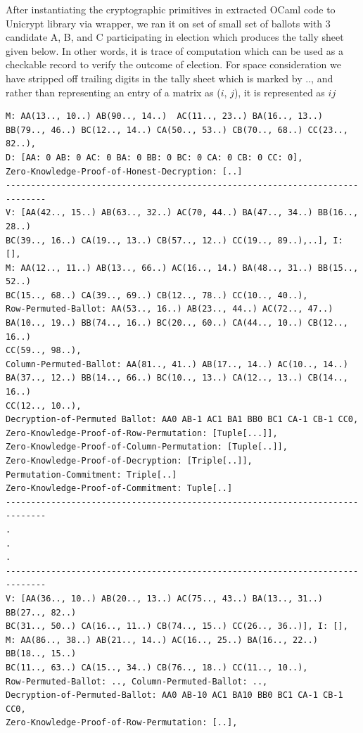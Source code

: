 \documentclass{llncs}
\begin{document}
 After instantiating the  
 cryptographic primitives in extracted OCaml code 
 to Unicrypt library via wrapper, we ran it on set of
 small set of ballots with 3 candidate A, B, and C participating in election
 which produces the tally sheet given below. In other words, 
 it is trace of computation which can be used as a checkable record to verify
 the outcome of election. For space consideration we have stripped off 
 trailing digits in the tally sheet which is marked by $..$, and rather 
 than representing an entry of a matrix as ($i$, $j$), it is represented as 
 $ij$
 

\begin{lstlisting}[frame=single,basicstyle=\ttfamily\scriptsize]
M: AA(13.., 10..) AB(90.., 14..)  AC(11.., 23..) BA(16.., 13..) 
BB(79.., 46..) BC(12.., 14..) CA(50.., 53..) CB(70.., 68..) CC(23.., 82..), 
D: [AA: 0 AB: 0 AC: 0 BA: 0 BB: 0 BC: 0 CA: 0 CB: 0 CC: 0], 
Zero-Knowledge-Proof-of-Honest-Decryption: [..]
------------------------------------------------------------------------------
V: [AA(42.., 15..) AB(63.., 32..) AC(70, 44..) BA(47.., 34..) BB(16.., 28..)
BC(39.., 16..) CA(19.., 13..) CB(57.., 12..) CC(19.., 89..),..], I:  [], 
M: AA(12.., 11..) AB(13.., 66..) AC(16.., 14.) BA(48.., 31..) BB(15.., 52..)
BC(15.., 68..) CA(39.., 69..) CB(12.., 78..) CC(10.., 40..),
Row-Permuted-Ballot: AA(53.., 16..) AB(23.., 44..) AC(72.., 47..) 
BA(10.., 19..) BB(74.., 16..) BC(20.., 60..) CA(44.., 10..) CB(12.., 16..)
CC(59.., 98..),
Column-Permuted-Ballot: AA(81.., 41..) AB(17.., 14..) AC(10.., 14..) 
BA(37.., 12..) BB(14.., 66..) BC(10.., 13..) CA(12.., 13..) CB(14.., 16..)
CC(12.., 10..),
Decryption-of-Permuted Ballot: AA0 AB-1 AC1 BA1 BB0 BC1 CA-1 CB-1 CC0,
Zero-Knowledge-Proof-of-Row-Permutation: [Tuple[...]], 
Zero-Knowledge-Proof-of-Column-Permutation: [Tuple[..]], 
Zero-Knowledge-Proof-of-Decryption: [Triple[..]], 
Permutation-Commitment: Triple[..]
Zero-Knowledge-Proof-of-Commitment: Tuple[..]
------------------------------------------------------------------------------
.
.
.
------------------------------------------------------------------------------
V: [AA(36.., 10..) AB(20.., 13..) AC(75.., 43..) BA(13.., 31..) BB(27.., 82..)
BC(31.., 50..) CA(16.., 11..) CB(74.., 15..) CC(26.., 36..)], I: [],
M: AA(86.., 38..) AB(21.., 14..) AC(16.., 25..) BA(16.., 22..) BB(18.., 15..)
BC(11.., 63..) CA(15.., 34..) CB(76.., 18..) CC(11.., 10..), 
Row-Permuted-Ballot: .., Column-Permuted-Ballot: .., 
Decryption-of-Permuted-Ballot: AA0 AB-10 AC1 BA10 BB0 BC1 CA-1 CB-1 CC0,
Zero-Knowledge-Proof-of-Row-Permutation: [..],

\end{lstlisting}
\end{document}

